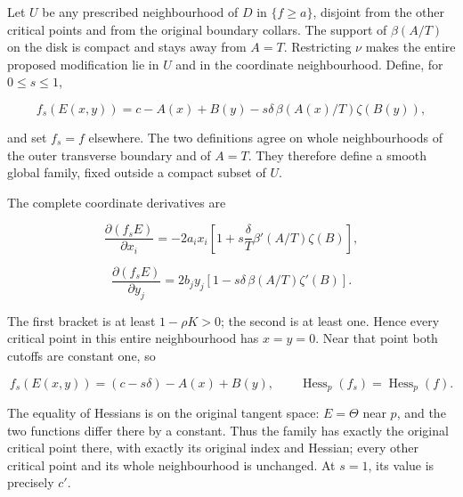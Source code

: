 Let \(U\) be any prescribed neighbourhood of \(D\) in \(\{f\geq a\}\), disjoint from the other critical points and from the original boundary collars. The support of \(\beta(A/T)\) on the disk is compact and stays away from \(A=T\). Restricting \(\nu\) makes the entire proposed modification lie in \(U\) and in the coordinate neighbourhood. Define, for \(0\leq s\leq1\),

\begin{equation}
f_s(E(x,y))
 =
 c-A(x)+B(y)
 -s\delta\,\beta(A(x)/T)\zeta(B(y)),
 \label{courseIII:morse-trajectories-and-critical-value-lowering:eq:4.4}
\end{equation}

and set \(f_s=f\) elsewhere. The two definitions agree on whole neighbourhoods of the outer transverse boundary and of \(A=T\). They therefore define a smooth global family, fixed outside a compact subset of \(U\).

The complete coordinate derivatives are

\begin{equation}
\frac{\partial(f_sE)}{\partial x_i}
 =-2a_i x_i
 \left[1+s\frac{\delta}{T}\beta'(A/T)\zeta(B)\right],
 \label{courseIII:morse-trajectories-and-critical-value-lowering:eq:4.5}
\end{equation}

\begin{equation}
\frac{\partial(f_sE)}{\partial y_j}
 =2b_j y_j
 \left[1-s\delta\,\beta(A/T)\zeta'(B)\right].
 \label{courseIII:morse-trajectories-and-critical-value-lowering:eq:4.6}
\end{equation}

The first bracket is at least \(1-\rho K>0\); the second is at least one. Hence every critical point in this entire neighbourhood has \(x=y=0\). Near that point both cutoffs are constant one, so

\begin{equation}
f_s(E(x,y))=(c-s\delta)-A(x)+B(y),
 \qquad
 \operatorname{Hess}_p(f_s)=\operatorname{Hess}_p(f).
 \label{courseIII:morse-trajectories-and-critical-value-lowering:eq:4.7}
\end{equation}

The equality of Hessians is on the original tangent space: \(E=\Theta\) near \(p\), and the two functions differ there by a constant. Thus the family has exactly the original critical point there, with exactly its original index and Hessian; every other critical point and its whole neighbourhood is unchanged. At \(s=1\), its value is precisely \(c'\).

